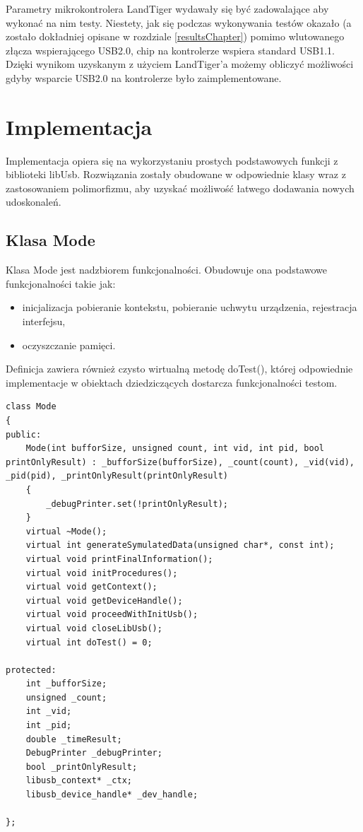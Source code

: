 \documentclass{BscUS}
\newcommand\blankpage{%
    \null
    \thispagestyle{empty}%
    \newpage}
\begin{document}
Parametry mikrokontrolera LandTiger wydawały się być zadowalające aby wykonać na nim testy. Niestety, jak się podczas wykonywania testów okazało (a zostało dokładniej opisane w rozdziale \ref{resultsChapter}) pomimo wlutowanego złącza wspierającego USB2.0, chip na kontrolerze wspiera standard USB1.1. Dzięki wynikom uzyskanym z użyciem LandTiger'a możemy obliczyć możliwości gdyby wsparcie USB2.0 na kontrolerze było zaimplementowane.
\afterpage{\blankpage}

\chapter{Implementacja}
\label{implementationChapter}
Implementacja opiera się na wykorzystaniu prostych podstawowych funkcji z biblioteki libUsb. Rozwiązania zostały obudowane w odpowiednie klasy wraz z zastosowaniem polimorfizmu, aby uzyskać możliwość łatwego dodawania nowych udoskonaleń.

\section{Klasa Mode}
Klasa Mode jest nadzbiorem funkcjonalności. Obudowuje ona podstawowe funkcjonalności takie jak:
\begin{itemize}
\item inicjalizacja
\subitem pobieranie kontekstu,
\subitem pobieranie uchwytu urządzenia,
\subitem rejestracja interfejsu,
\item oczyszczanie pamięci.
\end{itemize}
Definicja zawiera również czysto wirtualną metodę doTest(), której odpowiednie implementacje w obiektach dziedziczących dostarcza funkcjonalności testom.
\begin{lstlisting}[caption={Deklaracja klasy Mode},label={lst:CMode}]
class Mode
{
public:
	Mode(int bufforSize, unsigned count, int vid, int pid, bool printOnlyResult) : _bufforSize(bufforSize), _count(count), _vid(vid), _pid(pid), _printOnlyResult(printOnlyResult)
	{
		_debugPrinter.set(!printOnlyResult);
	}
	virtual ~Mode();
	virtual int generateSymulatedData(unsigned char*, const int);
	virtual void printFinalInformation();
	virtual void initProcedures();
	virtual void getContext();
	virtual void getDeviceHandle();
	virtual void proceedWithInitUsb();
	virtual void closeLibUsb();
	virtual int doTest() = 0;
	
protected:
	int _bufforSize;
	unsigned _count;
	int _vid;
	int _pid;
	double _timeResult;
	DebugPrinter _debugPrinter;
	bool _printOnlyResult;
	libusb_context* _ctx;
	libusb_device_handle* _dev_handle;

};
\end{lstlisting}
\end{document}
